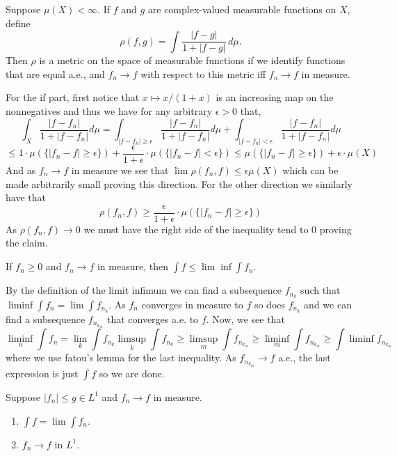 \documentclass[12pt,a4paper]{article}
\begin{document}
\begin{problem}\label{prob:2-32}
Suppose $\mu(X) < \infty$. If $f$ and $g$ are complex-valued measurable functions on $X$, define
\[ \rho(f, g) = \int \frac{|f - g|}{1 + |f - g|} \, d\mu. \]
Then $\rho$ is a metric on the space of measurable functions if we identify functions that are equal a.e., and $f_n \to f$ with respect to this metric iff $f_n \to f$ in measure.
\end{problem}
\begin{solution}
    For the if part, first notice that $x\mapsto x/(1+x)$ is an increasing map on the nonnegatives and thus we have for any arbitrary $\epsilon>0$ that,
\[
	\int_X \frac{|f-f_n|}{1+|f-f_n|}d\mu=\int_{|f-f_n|\geq\epsilon} \frac{|f-f_n|}{1+|f-f_n|}d\mu+\int_{|f-f_n|<\epsilon} \frac{|f-f_n|}{1+|f-f_n|}d\mu
\]
\[
	\leq 1\cdot\mu(\{|f_n-f|\geq\epsilon\})+\frac{\epsilon}{1+\epsilon}\cdot\mu(\{|f_n-f|<\epsilon\})\leq\mu(\{|f_n-f|\geq\epsilon\})+\epsilon\cdot\mu(X)
\]
And as $f_n\to f$ in measure we see that $\lim\rho(f_n,f)\leq\epsilon\mu(X)$ which can be made arbitrarily small proving this direction.
For the other direction we similarly have that
\[
	\rho(f_n,f)\geq \frac{\epsilon}{1+\epsilon}\cdot\mu(\{|f_n-f|\geq\epsilon\})
\]
As $\rho(f_n,f)\to 0$ we must have the right side of the inequality tend to $0$ proving the claim.
\end{solution}
\begin{problem}\label{prob:2-33}
If $f_n \ge 0$ and $f_n \to f$ in measure, then $\int f \le \lim \inf \int f_n$.
\end{problem}
\begin{solution}
	By the definition of the limit infimum we can find a subsequence $f_{n_k}$ such that $\liminf\int f_n=\lim\int f_{n_k}$.
	As $f_n$ converges in measure to $f$ so does $f_{n_k}$ and we can find a subsequence $f_{n_{k_m}}$ that converges a.e. to $f$. Now, we see that
\[
	\liminf_n\int f_n=\lim_k\int f_{n_k}\limsup_k\int f_{n_k}\geq\limsup_m\int f_{n_{k_m}}\geq\liminf_m\int f_{n_{k_m}}\geq\int\liminf f_{n_{k_m}}
\]
where we use fatou's lemma for the last inequality. 
As $f_{n_{k_m}}\to f$ a.e., the last expression is just $\int f$ so we are done.
\end{solution}
\begin{problem}\label{prob:2-34}
Suppose $|f_n| \le g \in L^1$ and $f_n \to f$ in measure.
\begin{enumerate}[label=\alph*.]
    \item $\int f = \lim \int f_n$.
    \item $f_n \to f$ in $L^1$.
\end{enumerate}
\end{problem}
\end{document}
